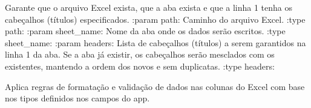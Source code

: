 \documentclass[letterpaper,10pt,english]{sphinxmanual}
\begin{document}

\begin{fulllineitems}
\label{\detokenize{api/excel_io:excel_io.ensure_workbook}}
\pysigstartsignatures
\pysiglinewithargsret
{}
{\sphinxparamcomma {}\sphinxparamcomma {}}
{}
\pysigstopsignatures
\sphinxAtStartPar
Garante que o arquivo Excel exista, que a aba exista e que a linha 1 tenha os cabeçalhos (títulos) especificados.
:param path: Caminho do arquivo Excel.
:type path: 
:param sheet\_name: Nome da aba onde os dados serão escritos.
:type sheet\_name: 
:param headers: Lista de cabeçalhos (títulos) a serem garantidos na linha 1 da aba. Se a aba já existir, os cabeçalhos serão mesclados com os existentes, mantendo a ordem dos novos e sem duplicatas.
:type headers: 
\begin{quote}\begin{description}
\sphinxAtStartPar
{}

\end{description}\end{quote}

\end{fulllineitems}


\begin{fulllineitems}
\label{\detokenize{api/excel_io:excel_io.apply_column_type_rules}}
\pysigstartsignatures
\pysiglinewithargsret
{}
{\sphinxparamcomma {}\sphinxparamcomma {}}
{}
\pysigstopsignatures
\sphinxAtStartPar
Aplica regras de formatação e validação de dados nas colunas do Excel com base nos tipos definidos nos campos do app.
\begin{quote}\begin{description}
\sphinxAtStartPar
{}

\end{description}\end{quote}

\end{fulllineitems}
\end{document}
